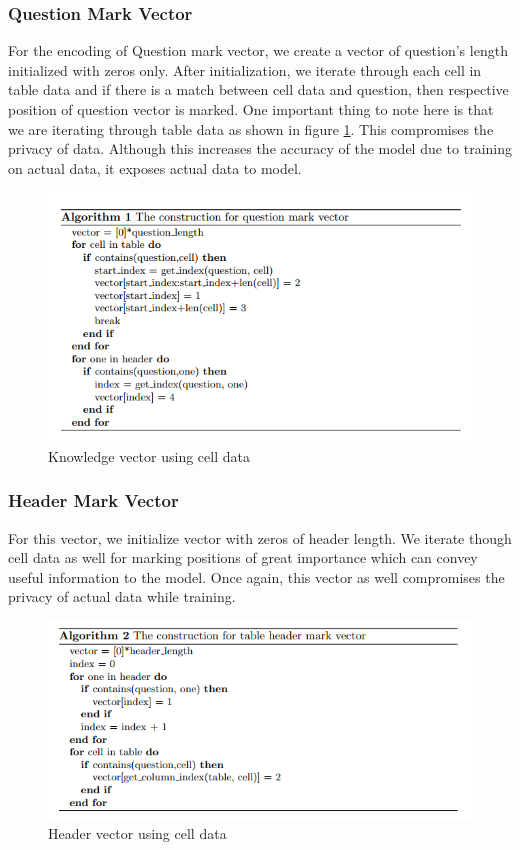 \documentclass[12pt]{article}
\begin{document}
\subsubsection{Question Mark Vector}
For the encoding of Question mark vector, we create a vector of question's length initialized with zeros only. After initialization, we iterate through each cell in table data and if there is a match between cell data and question, then respective position of question vector is marked. One important thing to note here is that we are iterating through table data as shown in figure \ref{cellfeature1}. This compromises the privacy of data. Although this increases the accuracy of the model due to training on actual data, it exposes actual data to model. 

\begin{figure}[H]
    \includegraphics[width=400pt]{cellfeature}
    \caption{Knowledge vector using cell data}
    \label{cellfeature1}
\end{figure}

\subsubsection{Header Mark Vector}
For this vector, we initialize vector with zeros of header length. We iterate though cell data as well for marking positions of great importance which can convey useful information to the model. Once again, this vector as well compromises the privacy of actual data while training. 

\begin{figure}[H]
    \includegraphics[width=400pt]{headermarkvetorbert}
    \caption{Header vector using cell data}
    \label{headermarkvetorbert1}
\end{figure}
\end{document}
